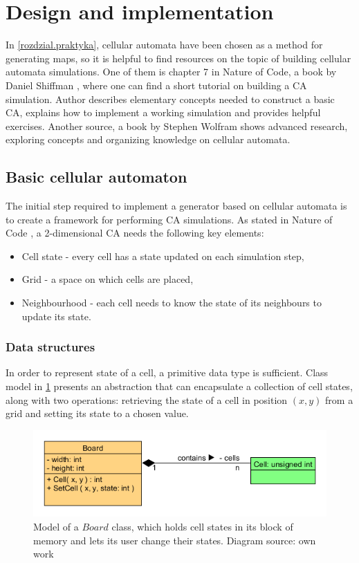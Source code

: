 \documentclass[12pt]{report}
\begin{document}
\section{Design and implementation} 

In \cref{rozdzial.praktyka}, cellular automata have been chosen as a method for generating maps, so it is helpful to find resources on the topic of building cellular automata simulations. One of them is chapter 7 in Nature of Code, a book by Daniel Shiffman \autocite{shiffman2012nature}, where one can find a short tutorial on building a CA simulation. Author describes elementary concepts needed to construct a basic CA, explains how to implement a working simulation and provides helpful exercises. Another source, a book by Stephen Wolfram  \autocite{wolfram2002new} shows advanced research, exploring concepts and organizing knowledge on cellular automata.

\subsection{Basic cellular automaton}

The initial step required to implement a generator based on cellular automata is to create a framework for performing CA simulations. As stated in Nature of Code \autocite{shiffman2012nature}, a 2-dimensional CA needs the following key elements:

\begin{itemize}
	\item Cell state - every cell has a state updated on each simulation step,
	\item Grid - a space on which cells are placed,
	\item Neighbourhood - each cell needs to know the state of its neighbours to update its state.
\end{itemize}

\subsubsection{Data structures}
In order to represent state of a cell, a primitive data type is sufficient. Class model in \cref{fig:boardcell} presents an abstraction that can encapsulate a collection of cell states, along with two operations: retrieving the state of a cell in position $(x,y)$ from a grid and setting its state to a chosen value. 

\begin{figure}[h]
	\centering
	\includegraphics[width=0.8\linewidth]{diagrams/boardcell01}
	\caption{ Model of a $Board$ class, which holds cell states in its block of memory and lets its user change their states. Diagram source: own work} 
	\label{fig:boardcell}
\end{figure}
\end{document}
